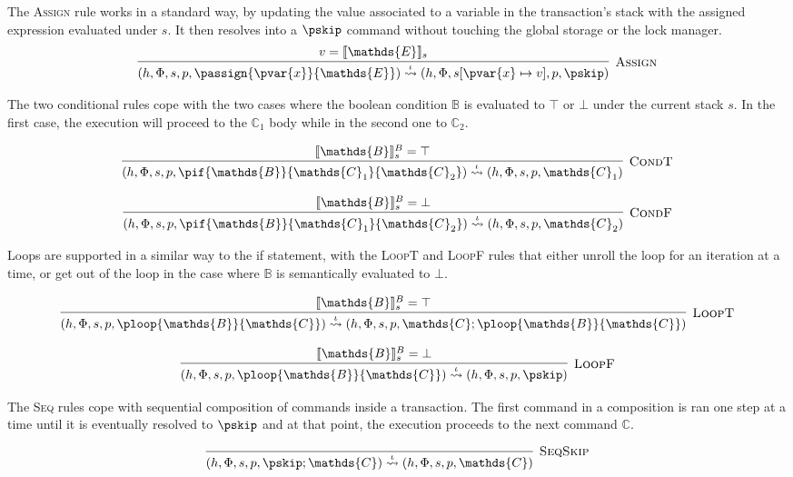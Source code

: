 The \textsc{Assign} rule works in a standard way, by updating the value associated to a variable in the transaction's stack with the assigned expression evaluated under $s$. It then resolves into a $\pskip$ command without touching the global storage or the lock manager.
\[
\infer[\textsc{Assign}]
{
	(h, \Phi, s, p, \passign{\pvar{x}}{\mathds{E}})
	\overset{\iota}{\rightsquigarrow}
	(h, \Phi, s[\pvar{x} \mapsto v], p, \pskip)
}
{
	v = \llbracket \mathds{E} \rrbracket_s
}
\]

The two conditional rules cope with the two cases where the boolean condition $\mathds{B}$ is evaluated to $\top$ or $\bot$ under the current stack $s$. In the first case, the execution will proceed to the $\mathds{C}_1$ body while in the second one to $\mathds{C}_2$.

\[
\infer[\textsc{CondT}]
{
	(h, \Phi, s, p, \pif{\mathds{B}}{\mathds{C}_1}{\mathds{C}_2})
	\overset{\iota}{\rightsquigarrow}
	(h, \Phi, s, p, \mathds{C}_1)
}
{
	\llbracket \mathds{B} \rrbracket_s^B = \top
}
\]

\[
\infer[\textsc{CondF}]
{
	(h, \Phi, s, p, \pif{\mathds{B}}{\mathds{C}_1}{\mathds{C}_2})
	\overset{\iota}{\rightsquigarrow}
	(h, \Phi, s, p, \mathds{C}_2)
}
{
	\llbracket \mathds{B} \rrbracket_s^B = \bot
}
\]

Loops are supported in a similar way to the if statement, with the \textsc{LoopT} and \textsc{LoopF} rules that either unroll the loop for an iteration at a time, or get out of the loop in the case where $\mathds{B}$ is semantically evaluated to $\bot$.

\[
\infer[\textsc{LoopT}]
{
	(h, \Phi, s, p, \ploop{\mathds{B}}{\mathds{C}})
	\overset{\iota}{\rightsquigarrow}
	(h, \Phi, s, p, \mathds{C}; \ploop{\mathds{B}}{\mathds{C}})
}
{
	\llbracket \mathds{B} \rrbracket_s^B = \top
}
\]

\[
\infer[\textsc{LoopF}]
{
	(h, \Phi, s, p, \ploop{\mathds{B}}{\mathds{C}})
	\overset{\iota}{\rightsquigarrow}
	(h, \Phi, s, p, \pskip)
}
{
	\llbracket \mathds{B} \rrbracket_s^B = \bot
}
\]

The \textsc{Seq} rules cope with sequential composition of commands inside a transaction. The first command in a composition is ran one step at a time until it is eventually resolved to $\pskip$ and at that point, the execution proceeds to the next command $\mathds{C}$.

\[
\infer[\textsc{SeqSkip}]
{
	(h, \Phi, s, p, \pskip ; \mathds{C})
	\overset{\iota}{\rightsquigarrow}
	(h, \Phi, s, p, \mathds{C})
}
{}
\]

